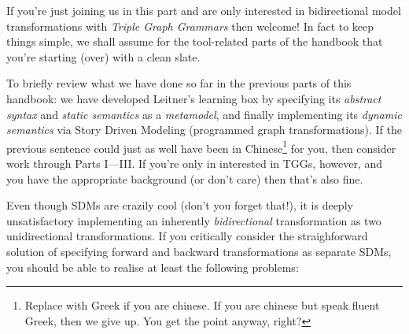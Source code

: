 \genHeader
\label{chap:Learning-Box-to-Dictionary-and-Back-Again}

\downloadLocation{\dlPartFour}

If you're just joining us in this part and are only interested in bidirectional model transformations with \emph{Triple Graph Grammars} then welcome! 
In fact to keep things simple, we shall assume for the tool-related parts of the handbook that you're starting (over) with a clean slate. 

To briefly review what we have done so far in the previous parts of this handbook: we have developed Leitner's learning box by specifying its \emph{abstract syntax} and \emph{static semantics} as a
\emph{metamodel}, and finally implementing its \emph{dynamic semantics} via Story Driven Modeling (programmed graph transformations). If the previous sentence
could just as well have been in Chinese\footnote{Replace with Greek if you are chinese.  If you are chinese but speak fluent Greek, then we give up. You get the
point anyway, right?} for you, then consider work through Parts I---III.
If you're only in interested in TGGs, however, and you have the appropriate background (or don't care) then that's also fine.

Even though SDMs are crazily cool (don't you forget that!), it is deeply unsatisfactory implementing an inherently \emph{bidirectional} transformation as two unidirectional transformations. 
If you critically consider the straighforward solution of specifying forward and backward transformations as separate SDMs, you should be able to realise at least the following problems:

\vspace{-0.5cm}

